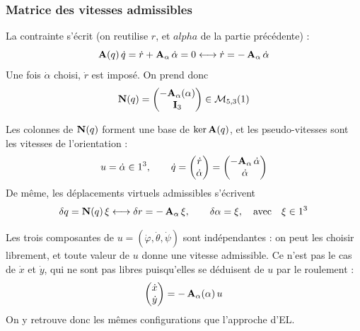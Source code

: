\subsubsection{Matrice des vitesses admissibles}

La contrainte s'écrit (on reutilise $r$, et $alpha$ de la partie précédente) :
\[
    \mathbf{A}(q)\,\dot q = \dot r + \mathbf{A}_\alpha\,\dot\alpha = 0
    \longleftrightarrow
    \dot r = -\,\mathbf{A}_\alpha\,\dot\alpha
\]
Une fois $\dot\alpha$ choisi, $\dot r$ est imposé. On prend donc
\[
    \mathbf{N}(q) = \begin{pmatrix} -\mathbf{A}_\alpha(\alpha)\\ \mathbf{I}_3
    \end{pmatrix}\in\mathcal{M}_{5,3}(1)
\]

\begin{proposition}
    Les colonnes de $\mathbf{N}(q)$ forment une base de
    $\ker\mathbf{A}(q)$, et les pseudo-vitesses sont les vitesses de
    l'orientation :
    \[
        u = \dot\alpha\in1^3,
        \qquad
        \dot q = \begin{pmatrix} \dot r\\ \dot\alpha \end{pmatrix}
        = \begin{pmatrix} -\mathbf{A}_\alpha\,\dot\alpha\\ \dot\alpha
        \end{pmatrix}
    \]
    De même, les déplacements virtuels admissibles s'écrivent
    \[
        \delta q = \mathbf{N}(q)\,\xi
        \longleftrightarrow
        \delta r = -\,\mathbf{A}_\alpha\,\xi,
        \qquad
        \delta\alpha = \xi,
        \quad \text{avec} \quad \xi\in1^3
    \]
\end{proposition}

\begin{remarque}
    Les trois composantes de $u = (\dot\varphi,\dot\theta,\dot\psi)$
    sont indépendantes : on peut les choisir librement, et toute
    valeur de $u$ donne une vitesse admissible. Ce n'est pas le cas de
    $\dot x$ et $\dot y$, qui ne sont pas libres puisqu'elles se
    déduisent de $u$ par le roulement :
    \[
        \begin{pmatrix} \dot x\\ \dot y \end{pmatrix}
        = -\,\mathbf{A}_\alpha(\alpha)\,u
    \]
    On y retrouve donc les mêmes configurations que l'approche d'EL.
\end{remarque}

